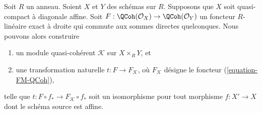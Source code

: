 \begin{lemma}
\label{lemma-functor-quasi-coherent-from-affine-diagonal-pre}
Soit $R$ un anneau. Soient $X$ et $Y$ des schémas sur $R$. Supposons que $X$
soit quasi-compact à diagonale affine. Soit
$F : \QCoh(\mathcal{O}_X) \to \QCoh(\mathcal{O}_Y)$
un foncteur $R$-linéaire exact à droite qui commute
aux sommes directes quelconques. Nous pouvons alors construire
\begin{enumerate}
\item un module quasi-cohérent $\mathcal{K}$ sur $X \times_R Y$, et
\item une transformation naturelle $t : F \to F_\mathcal{K}$,
où $F_\mathcal{K}$ désigne le foncteur (\ref{equation-FM-QCoh}),
\end{enumerate}
telle que $t : F \circ f_* \to F_\mathcal{K} \circ f_*$ soit un isomorphisme
pour tout morphisme $f : X' \to X$ dont le schéma source est affine.
\end{lemma}

